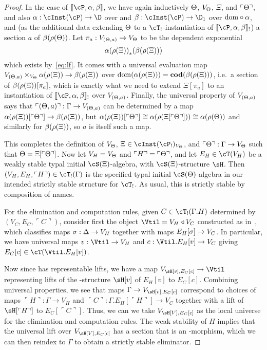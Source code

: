 \documentclass[referee]{psp}
\def\name#1{\ulcorner #1\urcorner}
\let\S\cS
\let\P\cP
\def\termps#1#2#3{\llbracket #1,#2,#3\rrbracket}
\let\C\cC
\let\T\cT
\begin{document}
\begin{proof}
  In the case of $\termps{\P}{\al}{\be}$, we have again inductively $\Theta$, $V_\Theta$, $\Xi$, and $\name{\Th}$, and also $\al:\cInst(\P)\to\D$ over \C and $\be:\cInst(\P)\to\D_1$ over $\mathrm{dom}\circ \alpha$, and (as the additional data extending $\Theta$ to a $\T_!$-instantiation of $\termps{\P}{\al}{\be}_!$) a section $a$ of $\beta(\rho(\Theta))$.
  Let $\pi_a : V_{(\Theta,a)} \to V_\Theta$ to be the dependent exponential
  \[ {\alpha(\rho(\Xi))}_*(\beta(\rho(\Xi))) \]
  which exists by~\eqref{eq:lf}.
  It comes with a universal evaluation map $V_{(\Theta,a)} \times_{V_\Theta} \alpha(\rho(\Xi)) \to \beta(\rho(\Xi))$ over $\mathrm{dom}(\alpha(\rho(\Xi))) = \mathbf{cod}(\beta(\rho(\Xi)))$, i.e.\ a section of $\beta(\rho(\Xi))[\pi_a]$, which is exactly what we need to extend $\Xi[\pi_a]$ to an instantiation of $\termps{\P}{\al}{\be}_!$ over $V_{(\Theta,a)}$.
  Finally, the universal property of $V_{(\Theta,a)}$ says that $\name{(\Th,a)} : \Gamma \to V_{(\Th,a)}$ can be determined by a map $\al(\rho(\Xi))[\name{\Th}] \to \be(\rho(\Xi))$, but $\al(\rho(\Xi))[\name{\Th}] \cong \al(\rho(\Xi[\name{\Th}])) \cong \al(\rho(\Th))$ and similarly for $\beta(\rho(\Xi))$, so $a$ is itself such a map.
  
  This completes the definition of $V_\Theta$, $\Xi\in\cInst(\P_!)_{V_\Th}$, and $\name{\Th} : \Gamma\to V_\Th$ such that $\Th = \Xi[\name{\Th}]$.
  Now let $V_H = V_\Theta$ and $\name{H} = \name{\Th}$, and let $E_H\in\T(V_H)$ be a weakly stable typal initial $\S(\Xi)$-algebra, with $\S(\Xi)$-structure $\sH$.
  Then $(V_H,E_H,\name{H})\in\T_!(\Gamma)$ is the specified typal initial $\S(\Th)$-algebra in our intended strictly stable structure for $\T_!$.
  As usual, this is strictly stable by composition of names.

  For the elimination and computation rules, given $C\in \T_!(\Gamma.H)$ determined by $(V_C,E_C,\name{C})$, consider first the object $\Vtil = V_H\triangleleft V_C$ constructed as in~\cite{lw:localuniv}, which classifies maps $\sigma : \Delta \to V_H$ together with maps $E_H[\sigma] \to V_C$.
  In particular, we have universal maps $v:\Vtil\to V_H$ and $c:\Vtil.E_H[v]\to V_C$ giving $E_C[c]\in \T(\Vtil.E_H[v])$.

  Now since \S has representable lifts, we have a map $V_{\sH[v],E_C[c]} \to \Vtil$ representing lifts of the \S-structure $\sH[v]$ of $E_H[v]$ to $E_C[c]$.
  Combining universal properties, we see that maps $\Gamma\to V_{\sH[v],E_C[c]}$ correspond to choices of maps $\name{H}:\Gamma\to V_H$ and $\name{C}:\Gamma.E_H[\name{H}]\to V_C$ together with a lift of $\sH[\name{H}]$ to $E_C[\name{C}]$.
  Thus, we can we take $V_{\sH[V],E_C[c]}$ as the local universe for the elimination and computation rules.
  The weak stability of $H$ implies that the universal lift over $V_{\sH[V],E_C[c]}$ has a section that is an \S-morphism, which we can then reindex to $\Gamma$ to obtain a strictly stable eliminator.
\end{proof}
\end{document}
